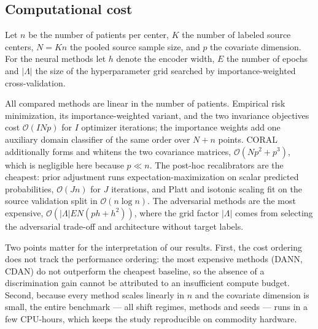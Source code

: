 %

\subsection{Computational cost}

Let $n$ be the number of patients per center, $K$ the number of labeled source
centers, $N = Kn$ the pooled source sample size, and $p$ the covariate
dimension. For the neural methods let $h$ denote the encoder width, $E$ the
number of epochs and $|\Lambda|$ the size of the hyperparameter grid searched by
importance-weighted cross-validation.

All compared methods are linear in the number of patients. Empirical risk
minimization, its importance-weighted variant, and the two invariance
objectives cost $\mathcal{O}(I N p)$ for $I$ optimizer iterations; the
importance weights add one auxiliary domain classifier of the same order over
$N + n$ points. CORAL additionally forms and whitens the two covariance
matrices, $\mathcal{O}(N p^{2} + p^{3})$, which is negligible here because
$p \ll n$. The post-hoc recalibrators are the cheapest: prior adjustment runs
expectation-maximization on scalar predicted probabilities,
$\mathcal{O}(J n)$ for $J$ iterations, and Platt and isotonic scaling fit on the
source validation split in $\mathcal{O}(n \log n)$. The adversarial methods are
the most expensive, $\mathcal{O}\!\left(|\Lambda| E N (ph + h^{2})\right)$,
where the grid factor $|\Lambda|$ comes from selecting the adversarial trade-off
and architecture without target labels.

Two points matter for the interpretation of our results. First, the cost
ordering does not track the performance ordering: the most expensive methods
(DANN, CDAN) do not outperform the cheapest baseline, so the absence of a
discrimination gain cannot be attributed to an insufficient compute budget.
Second, because every method scales linearly in $n$ and the covariate dimension
is small, the entire benchmark --- all shift regimes, methods and seeds --- runs
in a few CPU-hours, which keeps the study reproducible on commodity hardware.
